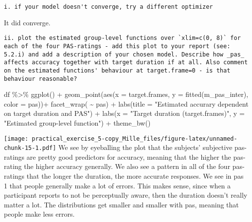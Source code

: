 \documentclass[
]{article}
\newenvironment{Shaded}{\begin{snugshade}}{\end{snugshade}}
\newcommand{\AttributeTok}[1]{\textcolor[rgb]{0.77,0.63,0.00}{#1}}
\newcommand{\FunctionTok}[1]{\textcolor[rgb]{0.00,0.00,0.00}{#1}}
\newcommand{\NormalTok}[1]{#1}
\newcommand{\SpecialCharTok}[1]{\textcolor[rgb]{0.00,0.00,0.00}{#1}}
\newcommand{\StringTok}[1]{\textcolor[rgb]{0.31,0.60,0.02}{#1}}
\begin{document}
\begin{verbatim}
i. if your model doesn't converge, try a different optimizer  
\end{verbatim}

It did converge.

\begin{verbatim}
ii. plot the estimated group-level functions over `xlim=c(0, 8)` for each of the four PAS-ratings - add this plot to your report (see: 5.2.i) and add a description of your chosen model. Describe how _pas_ affects accuracy together with target duration if at all. Also comment on the estimated functions' behaviour at target.frame=0 - is that behaviour reasonable?  
\end{verbatim}

\begin{Shaded}
\begin{Highlighting}[]
\NormalTok{df }\SpecialCharTok{\%\textgreater{}\%} 
  \FunctionTok{ggplot}\NormalTok{() }\SpecialCharTok{+} 
  \FunctionTok{geom\_point}\NormalTok{(}\FunctionTok{aes}\NormalTok{(}\AttributeTok{x =}\NormalTok{ target.frames, }\AttributeTok{y =} \FunctionTok{fitted}\NormalTok{(m\_pas\_inter), }\AttributeTok{color =}\NormalTok{ pas))}\SpecialCharTok{+}
  \FunctionTok{facet\_wrap}\NormalTok{( }\SpecialCharTok{\textasciitilde{}}\NormalTok{ pas) }\SpecialCharTok{+}
  \FunctionTok{labs}\NormalTok{(}\AttributeTok{title =} \StringTok{"Estimated accurary dependent on target duration and PAS"}\NormalTok{) }\SpecialCharTok{+}
  \FunctionTok{labs}\NormalTok{(}\AttributeTok{x =} \StringTok{"Target duration (target.frames)"}\NormalTok{, }\AttributeTok{y =} \StringTok{"Estimated group{-}level function"}\NormalTok{) }\SpecialCharTok{+} 
  \FunctionTok{theme\_bw}\NormalTok{()}
\end{Highlighting}
\end{Shaded}

\texttt{[image: practical\_exercise\_5-copy\_Mille\_files/figure-latex/unnamed-chunk-15-1.pdf]}
We see by eyeballing the plot that the subjects' subjective pas-ratings
are pretty good predictors for accuracy, meaning that the higher the
pas-rating the higher accuracy generally. We also see a pattern in all
of the four pas-ratings that the longer the duration, the more accurate
responses. We see in pas 1 that people generally make a lot of errors.
This makes sense, since when a participant reports to not be
perceptually aware, then the duration doesn't really matter a lot. The
distributions get smaller and smaller with pas, meaning that people make
less errors.
\end{document}
